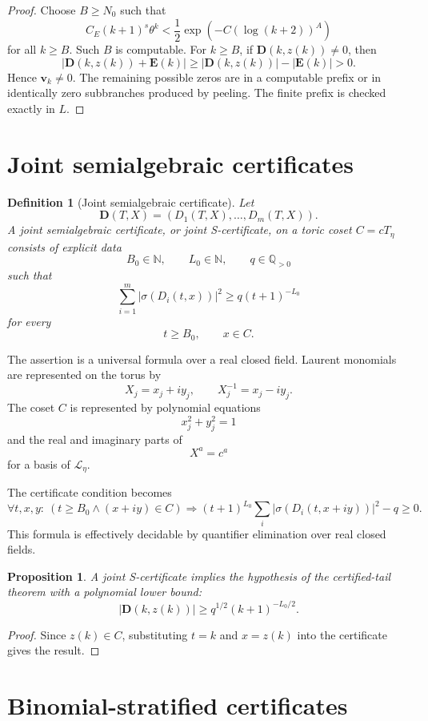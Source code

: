 \documentclass[11pt]{article}
\newtheorem{proposition}[theorem]{Proposition}
\newtheorem{definition}[theorem]{Definition}
\newcommand{\Q}{\mathbb Q}
\begin{document}
\begin{proof}
Choose \(B\ge N_0\) such that
\[
C_E(k+1)^s\theta^k
<
\frac12\exp(-C(\log(k+2))^A)
\]
for all \(k\ge B\). Such \(B\) is computable. For \(k\ge B\), if \(\mathbf D(k,z(k))\ne0\), then
\[
|\mathbf D(k,z(k))+\mathbf E(k)|
\ge
|\mathbf D(k,z(k))|-|\mathbf E(k)|
>0.
\]
Hence \(\mathbf v_k\ne0\). The remaining possible zeros are in a computable prefix or in identically zero subbranches produced by peeling. The finite prefix is checked exactly in \(L\).
\end{proof}

\section{Joint semialgebraic certificates}

\begin{definition}[Joint semialgebraic certificate]
Let
\[
\mathbf D(T,X)=(D_1(T,X),\ldots,D_m(T,X)).
\]
A joint semialgebraic certificate, or joint S-certificate, on a toric coset \(C=cT_\eta\) consists of explicit data
\[
B_0\in\mathbb N,\qquad L_0\in\mathbb N,\qquad q\in\Q_{>0}
\]
such that
\[
\sum_{i=1}^m|\sigma(D_i(t,x))|^2
\ge
q(t+1)^{-L_0}
\]
for every
\[
t\ge B_0,
\qquad
x\in C.
\]
\end{definition}

The assertion is a universal formula over a real closed field. Laurent monomials are represented on the torus by
\[
X_j=x_j+iy_j,
\qquad
X_j^{-1}=x_j-iy_j.
\]
The coset \(C\) is represented by polynomial equations
\[
x_j^2+y_j^2=1
\]
and the real and imaginary parts of
\[
X^a=c^a
\]
for a basis of \(\mathcal L_\eta\).

The certificate condition becomes
\[
\forall t,x,y:\ 
\left(t\ge B_0\wedge (x+iy)\in C\right)
\Rightarrow
(t+1)^{L_0}\sum_i|\sigma(D_i(t,x+iy))|^2-q\ge0.
\]
This formula is effectively decidable by quantifier elimination over real closed fields.

\begin{proposition}
A joint S-certificate implies the hypothesis of the certified-tail theorem with a polynomial lower bound:
\[
|\mathbf D(k,z(k))|\ge q^{1/2}(k+1)^{-L_0/2}.
\]
\end{proposition}

\begin{proof}
Since \(z(k)\in C\), substituting \(t=k\) and \(x=z(k)\) into the certificate gives the result.
\end{proof}

\section{Binomial-stratified certificates}
\end{document}
